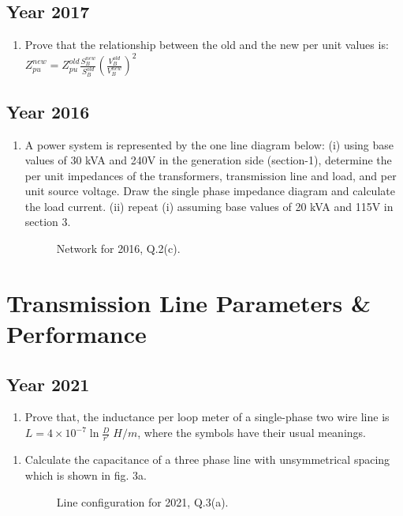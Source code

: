 \documentclass[12pt, a4paper]{article}
\begin{document}
	\subsection{Year 2017}
	\begin{enumerate}[label=\textbf{Q2(a).}, wide, labelindent=0pt]
		\item Prove that the relationship between the old and the new per unit values is: 
		$Z_{pu}^{new} = Z_{pu}^{old} \frac{S_B^{new}}{S_B^{old}} \left( \frac{V_B^{old}}{V_B^{new}} \right)^2$
	\end{enumerate}
	
	
	\subsection{Year 2016}
	\begin{enumerate}[label=\textbf{Q2(c).}, wide, labelindent=0pt]
		\item A power system is represented by the one line diagram below: 
		(i) using base values of 30 kVA and 240V in the generation side (section-1), determine the per unit impedances of the transformers, transmission line and load, and per unit source voltage. Draw the single phase impedance diagram and calculate the load current. (ii) repeat (i) assuming base values of 20 kVA and 115V in section 3.
		\begin{figure}[h!]
			\centering
			\caption{Network for 2016, Q.2(c).}
		\end{figure}
	\end{enumerate}
	
	\section{Transmission Line Parameters \& Performance}
	
	\subsection{Year 2021}
	\begin{enumerate}[label=\textbf{Q2(c).}, wide, labelindent=0pt]
		\item Prove that, the inductance per loop meter of a single-phase two wire line is $L = 4 \times 10^{-7} \ln \frac{D}{r'} \; H/m$, where the symbols have their usual meanings.
	\end{enumerate}
	\begin{enumerate}[label=\textbf{Q3(a).}, wide, labelindent=0pt]
		\item Calculate the capacitance of a three phase line with unsymmetrical spacing which is shown in fig. 3a.
		\begin{figure}[h!]
			\centering
			\caption{Line configuration for 2021, Q.3(a).}
		\end{figure}
	\end{enumerate}
	
\end{document}
